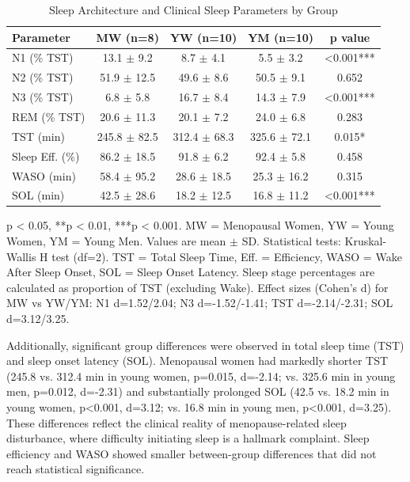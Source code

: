 \documentclass[ASNA,twocolumn]{USG}
\begin{document}
\begin{table}[!ht]
\centering
\caption{Sleep Architecture and Clinical Sleep Parameters by Group}
\begin{tabular*}{\textwidth}{@{\extracolsep\fill}lcccc@{\extracolsep\fill}}
\toprule
\textbf{Parameter} & \textbf{MW (n=8)} & \textbf{YW (n=10)} & \textbf{YM (n=10)} & \textbf{p value} \\
\midrule
N1 (\% TST) & 13.1 $\pm$ 9.2 & 8.7 $\pm$ 4.1 & 5.5 $\pm$ 3.2 & <0.001*** \\
N2 (\% TST) & 51.9 $\pm$ 12.5 & 49.6 $\pm$ 8.6 & 50.5 $\pm$ 9.1 & 0.652 \\
N3 (\% TST) & 6.8 $\pm$ 5.8 & 16.7 $\pm$ 8.4 & 14.3 $\pm$ 7.9 & <0.001*** \\
REM (\% TST) & 20.6 $\pm$ 11.3 & 20.1 $\pm$ 7.2 & 24.0 $\pm$ 6.8 & 0.283 \\
TST (min) & 245.8 $\pm$ 82.5 & 312.4 $\pm$ 68.3 & 325.6 $\pm$ 72.1 & 0.015* \\
Sleep Eff. (\%) & 86.2 $\pm$ 18.5 & 91.8 $\pm$ 6.2 & 92.4 $\pm$ 5.8 & 0.458 \\
WASO (min) & 58.4 $\pm$ 95.2 & 28.6 $\pm$ 18.5 & 25.3 $\pm$ 16.2 & 0.315 \\
SOL (min) & 42.5 $\pm$ 28.6 & 18.2 $\pm$ 12.5 & 16.8 $\pm$ 11.2 & <0.001*** \\
\bottomrule
\end{tabular*}
\begin{tablenotes}
\item *p < 0.05, **p < 0.01, ***p < 0.001. MW = Menopausal Women, YW = Young Women, YM = Young Men. Values are mean $\pm$ SD. Statistical tests: Kruskal-Wallis H test (df=2). TST = Total Sleep Time, Eff. = Efficiency, WASO = Wake After Sleep Onset, SOL = Sleep Onset Latency. Sleep stage percentages are calculated as proportion of TST (excluding Wake). Effect sizes (Cohen's d) for MW vs YW/YM: N1 d=1.52/2.04; N3 d=-1.52/-1.41; TST d=-2.14/-2.31; SOL d=3.12/3.25.
\end{tablenotes}
\label{tab:sleep_stats}
\end{table}

Additionally, significant group differences were observed in total sleep time (TST) and sleep onset latency (SOL). Menopausal women had markedly shorter TST (245.8 vs. 312.4 min in young women, p=0.015, d=-2.14; vs. 325.6 min in young men, p=0.012, d=-2.31) and substantially prolonged SOL (42.5 vs. 18.2 min in young women, p<0.001, d=3.12; vs. 16.8 min in young men, p<0.001, d=3.25). These differences reflect the clinical reality of menopause-related sleep disturbance, where difficulty initiating sleep is a hallmark complaint. Sleep efficiency and WASO showed smaller between-group differences that did not reach statistical significance.
\end{document}
